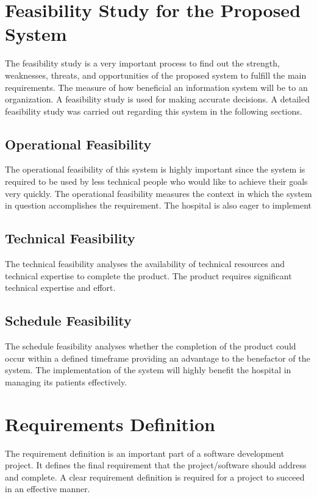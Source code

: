 \documentclass[12pt,a4paper]{report}
\begin{document}
\section{Feasibility Study for the Proposed System}

The feasibility study is a very important process to find out the strength, weaknesses, threats, and opportunities of the proposed system to fulfill the main requirements. The measure of how beneficial an information system will be to an organization. A feasibility study is used for making accurate decisions. A detailed feasibility study was carried out regarding this system in the following sections.

\subsection{Operational Feasibility}
The operational feasibility of this system is highly important since the system is required to be used by less technical people who would like to achieve their goals very quickly. The operational feasibility measures the context in which the system in question accomplishes the requirement. The hospital is also eager to implement 

\subsection{Technical Feasibility}
The technical feasibility analyses the availability of technical resources and technical expertise to complete the product. The product requires significant technical expertise and effort. 

\subsection{Schedule Feasibility}
The schedule feasibility analyses whether the completion of the product could occur within a defined timeframe providing an advantage to the benefactor of the system. The implementation of the system will highly benefit the hospital in managing its patients effectively. 

\section{Requirements Definition}
The requirement definition is an important part of a software development project. It defines the final requirement that the project/software should address and complete. A clear requirement definition is required for a project to succeed in an effective manner.
\end{document}
